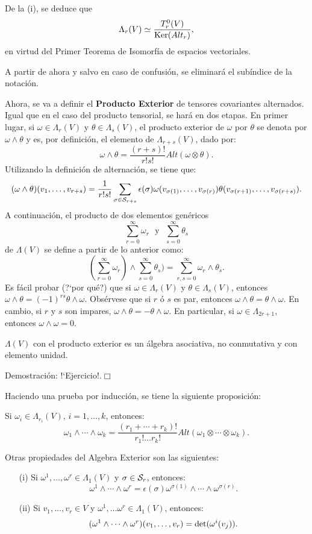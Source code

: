 \documentclass[cursovd_portada.tex]{subfiles}
\begin{document}
\par\bigskip
De la (i), se deduce que
$$\Lambda_r(V)\simeq\frac{T^0_r(V)}{{\rm Ker}(Alt_r)},$$
en virtud del Primer Teorema de Isomorfía de espacios vectoriales.
\par
A partir de ahora y salvo en caso de confusión, se eliminará el subíndice de la notación.
\par
Ahora, se va a definir el {\bf Producto Exterior} de tensores covariantes alternados. Igual que en el caso del
producto tensorial, se hará en dos etapas. En primer lugar, si $\omega\in\Lambda_r(V)$ y $\theta\in\Lambda_s(V)$,
el producto exterior de $\omega$ por $\theta$ se denota por $\omega\wedge \theta$ y es, por definición, el
elemento de $\Lambda_{r+s}(V)$, dado por:
$$\omega\wedge\theta=\frac{(r+s)!}{r!s!}Alt(\omega\otimes\theta).$$
\hs Utilizando la definición de alternación, se tiene que:
$$(\omega\wedge\theta )(v_1,\dots ,v_{r+s})=\frac{1}{r!s!}\sum_{\sigma\in{\cal
S}_{r+s}}\epsilon(\sigma)\omega(v_{\sigma (1)},\dots ,v_{\sigma (r)})\theta(v_ {\sigma (r+1)},\dots ,v_{\sigma
(r+s)}).$$ \hs A continuación, el producto de dos elementos genéricos
$$\sum_{r=0}^{\infty}\omega_r\mbox{ }\mbox{y}\mbox{ }\sum_{s=0}^{\infty}\theta_s$$
de $\Lambda (V)$ se define a partir de lo anterior como:
$$(\sum_{r=0}^{\infty}\omega_r)\wedge \sum_{s=0}^{\infty}\theta_s)=\sum_
{r,s=0}^{\infty}\omega_r\wedge\theta _s.$$ \hs Es fácil probar (?`por qué?) que si $\omega\in\Lambda_r(V)$ y
$\theta\in\Lambda _s(V)$, entonces $\omega\wedge\theta=(-1)^{rs}\theta\wedge\omega$. Obsérvese que si $r$ ó $s$ es
par, entonces $\omega\wedge\theta=\theta\wedge\omega$. En cambio, si $r$ y $s$ son impares,
$\omega\wedge\theta=-\theta\wedge\omega$. En particular, si $\omega\in\Lambda_{2r+1}$, entonces
$\omega\wedge\omega=0$.
\begin{propoap}
$\Lambda (V)$ con el producto exterior es un álgebra asociativa, no conmutativa y con elemento unidad.
\end{propoap}
{\sc Demostración:} !`Ejercicio!.\hfill$\Box$
\par\bigskip
Haciendo una prueba por inducción, se tiene la siguiente proposición:
\begin{propoap}
Si $\omega_i\in\Lambda_{r_i}(V)$, $i=1,\dots ,k$, entonces:
$$\omega_1\wedge\cdots\wedge\omega_k=\frac{(r_1+\cdots +r_k)!}{r_1!\dots r_k!}
Alt(\omega_1\otimes\cdots\otimes\omega _k).$$
\end{propoap}
\par\bigskip
Otras propiedades del Algebra Exterior son las siguientes:
\begin{propoap}
\begin{enumerate}
\item[(i)] Si $\omega ^1,\dots ,\omega^r\in\Lambda_1(V)$ y $\sigma\in{\cal S}
_r$, entonces:
$$\omega^1\wedge\cdots\wedge\omega^r=\epsilon(\sigma)\omega^{
\sigma(1)}\wedge\cdots\wedge\omega^{\sigma(r)}.$$
\item[(ii)] Si $v_1,\dots ,v_r\in V$ y $\omega^1,\dots\omega^r\in
\Lambda_1(V)$, entonces:
$$(\omega^1\wedge\cdots\wedge\omega^r)(v_1,\dots ,v_r)={\rm det}(\omega^i(v_j))
.$$
\end{enumerate}
\end{propoap}
\end{document}
